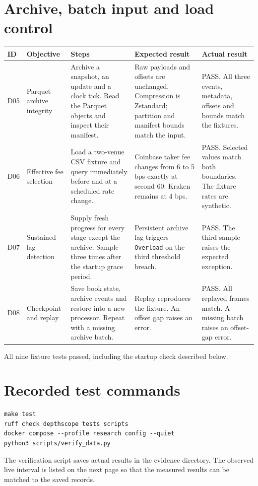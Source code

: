 \documentclass[10pt,a4paper]{article}
\begin{document}
\section{Archive, batch input and load control}
\small
\begin{tabularx}{\linewidth}{@{}P{7mm}P{25mm}LLL@{}}
\toprule
\textbf{ID} & \textbf{Objective} & \textbf{Steps} & \textbf{Expected result} & \textbf{Actual result}\\
\midrule
D05 & Parquet archive integrity & Archive a snapshot, an update and a clock tick. Read the Parquet objects and inspect their manifest. & Raw payloads and offsets are unchanged. Compression is Zstandard; partition and manifest bounds match the input. & PASS. All three events, metadata, offsets and bounds match the fixtures.\\\addlinespace
D06 & Effective fee selection & Load a two-venue CSV fixture and query immediately before and at a scheduled rate change. & Coinbase taker fee changes from 6 to 5 bps exactly at second 60. Kraken remains at 4 bps. & PASS. Selected values match both boundaries. The fixture rates are synthetic.\\\addlinespace
D07 & Sustained lag detection & Supply fresh progress for every stage except the archive. Sample three times after the startup grace period. & Persistent archive lag triggers \texttt{Overload} on the third threshold breach. & PASS. The third sample raises the expected exception.\\\addlinespace
D08 & Checkpoint and replay & Save book state, archive events and restore into a new processor. Repeat with a missing archive batch. & Replay reproduces the fixture. An offset gap raises an error. & PASS. All replayed frames match. A missing batch raises an offset-gap error.\\
\bottomrule
\end{tabularx}
\normalsize

\medskip
All nine fixture tests passed, including the startup check described below.

\section{Recorded test commands}
\begin{verbatim}
make test
ruff check depthscope tests scripts
docker compose --profile research config --quiet
python3 scripts/verify_data.py
\end{verbatim}

The verification script saves actual results in the evidence directory. The observed live interval is listed on the next page so that the measured results can be matched to the saved records.
\end{document}

